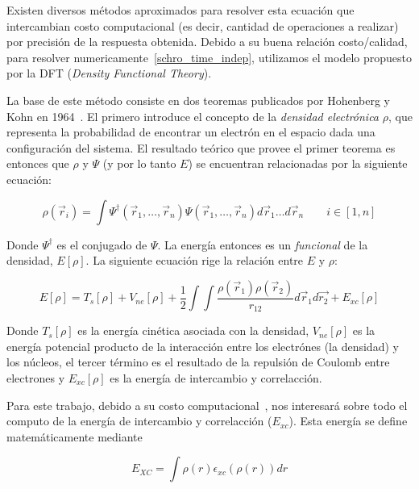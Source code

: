 Existen diversos m\'etodos aproximados para resolver esta ecuaci\'on que intercambian costo computacional (es decir, cantidad de operaciones a realizar)
por precisi\'on de la respuesta obtenida. Debido a su buena relaci\'on costo/calidad, para resolver numericamente~\ref{schro_time_indep}, utilizamos el modelo propuesto por la
DFT (\textit{Density Functional Theory}).

La base de este m\'etodo consiste en dos teoremas publicados por Hohenberg y Kohn en 1964~\cite{HohenbergKohn}. El primero introduce
el concepto de la \textit{densidad electr\'onica} $\rho$, que representa la probabilidad de encontrar un electr\'on en
el espacio dada una configuraci\'on del sistema. El resultado te\'orico que provee el primer teorema es entonces que
$\rho$ y $\Psi$ (y por lo tanto $E$) se encuentran relacionadas por la siguiente ecuaci\'on:

\begin{equation}
    \label{hohenberg_kohn}
    \rho(\vec{r}_i) = \int \Psi^{\dagger}(\vec{r}_1, \dots, \vec{r}_n) \Psi(\vec{r}_1, \dots, \vec{r}_n) d\vec{r}_1 \dots d\vec{r}_n \qquad i \in [1,n]
\end{equation}

Donde $\Psi^{\dagger}$ es el conjugado de $\Psi$. La energ\'ia entonces es un \textit{funcional} de la densidad, $E[\rho]$.
La siguiente ecuaci\'on rige la relaci\'on entre $E$ y $\rho$:

\begin{equation}
    \label{hohenberg_kohn_energy}
    E[\rho] = T_s[\rho] + V_{ne}[\rho] + \frac{1}{2} \int \int \frac{\rho(\vec{r}_1) \rho(\vec{r}_2)}{r_{12}} d\vec{r}_1 d\vec{r_2} + E_{xc}[\rho]
\end{equation}

Donde $T_s[\rho]$ es la energ\'ia cin\'etica asociada con la densidad, $V_{ne}[\rho]$ es la energ\'ia potencial producto de la interacci\'on entre los
electr\'ones (la densidad) y los n\'ucleos, el tercer t\'ermino es el resultado de la repulsi\'on de Coulomb entre electrones y $E_{xc}[\rho]$ es la
energ\'ia de intercambio y correlacci\'on.

Para este trabajo, debido a su costo computacional~\cite{LIO}, nos interesar\'a sobre todo el computo de la energ\'ia de intercambio y correlacci\'on ($E_{xc}$).
Esta energ\'ia se define matem\'aticamente mediante

\begin{equation}
    E_{XC} = \int \rho(r) \epsilon_{xc}\left( \rho(r) \right ) dr
\end{equation}

